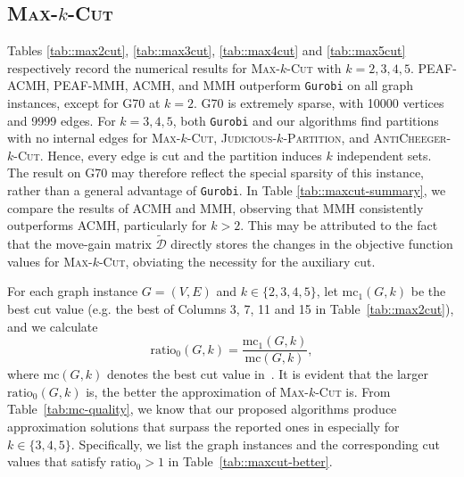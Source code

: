 \documentclass[12pt, a4paper]{article}%
\numberwithin{equation}{section}
\theoremstyle{plain}
\begin{document}
				
				\subsection{\textsc{Max}-$k$-\textsc{Cut}}
				\label{sec::result-maxcut}
				
				Tables \ref{tab::max2cut}, \ref{tab::max3cut}, \ref{tab::max4cut} and \ref{tab::max5cut} respectively record the numerical results for \textsc{Max}-$k$-\textsc{Cut} with $k=2, 3, 4, 5$. PEAF-ACMH, PEAF-MMH, ACMH, and MMH outperform \texttt{Gurobi} on all graph
instances, except for G70 at $k=2$. {G70 is extremely sparse, with
10000 vertices and 9999 edges. For $k=3,4,5$, both \texttt{Gurobi} and our
algorithms find partitions with no internal edges for
\textsc{Max}-$k$-\textsc{Cut}, \textsc{Judicious}-$k$-\textsc{Partition}, and
\textsc{AntiCheeger}-$k$-\textsc{Cut}. Hence, every edge is cut and the
partition induces $k$ independent sets. The result on G70 may therefore reflect
the special sparsity of this instance, rather than a general advantage of
\texttt{Gurobi}.}
				In Table \ref{tab::maxcut-summary}, we compare the results of ACMH and MMH, observing that MMH consistently outperforms ACMH, particularly for $k>2$. This may be attributed to the fact that the move-gain matrix $\widetilde{\mathcal{D}}$ directly stores the changes in the objective function values for \textsc{Max}-$k$-\textsc{Cut}, obviating the necessity for the auxiliary cut.
				
				
				For each graph instance $G=(V,E)$ and $k\in\{2,3,4,5\}$, let  $\text{mc}_1(G,k)$ be the best cut value (e.g. the best of Columns 3, 7, 11 and 15 in Table~\ref{tab::max2cut}), 
				and we calculate
				\begin{equation}
					\label{mc:ratio}
					\text{ratio}_0(G,k)=\frac{\text{mc}_1(G,k)}{\text{mc}(G,k)},  %
				\end{equation}
				where $\text{mc}(G,k)$ denotes the best cut value in~\cite{Ma2015}. It is evident that the larger $\text{ratio}_0(G,k)$ is, the better the approximation of \textsc{Max}-$k$-\textsc{Cut} is. From Table~\ref{tab:mc-quality}, we know that our proposed algorithms produce approximation solutions that surpass the reported ones in \cite{Ma2015} especially for $k \in\{3, 4, 5\}$. %
				Specifically, we list the graph instances and the corresponding cut values that satisfy $\text{ratio}_0>1$  in Table~\ref{tab::maxcut-better}.
				
\end{document}

